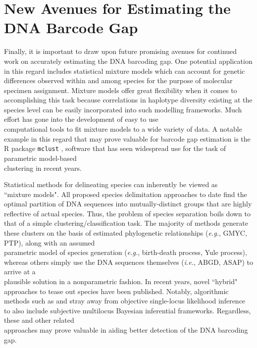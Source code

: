\section{New Avenues for Estimating the DNA Barcode Gap}

Finally, it is important to draw upon future promising avenues for continued work on accurately estimating the DNA barcoding gap. One potential application in this regard includes statistical mixture models which can account for genetic differences observed within and among species  for the purpose of molecular specimen assignment. Mixture models offer great flexibility when it comes to accomplishing this task because correlations in haplotype diversity existing at the species level can be easily incorporated into such modelling frameworks. Much effort has gone into the development of easy to use \\ computational tools to fit mixture models to a wide variety of data. A notable example in this regard that may prove valuable for barcode gap estimation is the R package {\tt mclust} \cite{scrucca2016mclust}, software that has seen widespread use for the task of parametric model-based \\ clustering in recent years.



Statistical methods for delineating species can inherently be viewed as \\ ``mixture models". All proposed species delimitation approaches to date find the optimal partition of DNA sequences into mutually-distinct groups that are highly reflective of actual species. Thus, the problem of species separation boils down to that of a simple clustering/classification task. The majority of methods generate these clusters on the basis of estimated phylogenetic relationships (\textit{e.g.}, GMYC, PTP), along with an assumed \\ parametric model of species generation (\textit{e.g.}, birth-death process, Yule process), whereas others simply use the DNA sequences themselves (\textit{i.e.}, ABGD, ASAP) to arrive at a \\ plausible solution in a nonparametric fashion. In recent years, novel ``hybrid" approaches to tease out species have been published. Notably, algorithmic methods such as \cite{fujisawa2016rapid} and \cite{jones2017algorithmic} stray away from objective single-locus likelihood inference to also include subjective multilocus Bayesian inferential frameworks. Regardless, these and other related \\ approaches may prove valuable in aiding better detection of the DNA barcoding gap.



